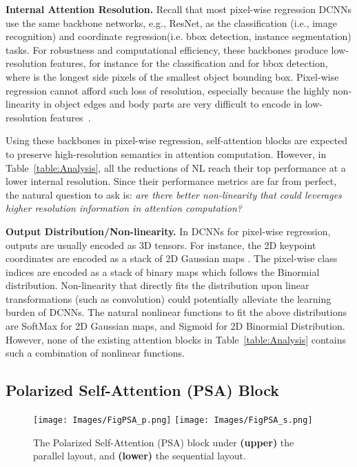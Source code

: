 \documentclass[10pt,twocolumn,letterpaper]{article}
\begin{document}
\textbf{Internal Attention Resolution.} Recall that most pixel-wise regression DCNNs use the same backbone networks, e.g., ResNet, as the classification (i.e., image recognition) and coordinate regression(i.e. bbox detection, instance segmentation) tasks. For robustness and computational efficiency, these backbones produce low-resolution features, for instance  for the classification and  for bbox detection, where  is the longest side pixels of the smallest object bounding box. Pixel-wise regression cannot afford such loss of resolution, especially because the highly non-linearity in object edges and body parts are very difficult to encode in low-resolution features~\cite{Chen17,Wang2020,Sun2019}.

Using these backbones in pixel-wise regression, self-attention blocks are expected to preserve high-resolution semantics in attention computation. However, in Table~\ref{table:Analysis}, all the reductions of NL reach their top performance at a lower internal resolution. Since their performance metrics are far from perfect, the natural question to ask is: \textit{are there better non-linearity that could leverages higher resolution information in attention computation?}

\textbf{Output Distribution/Non-linearity.} In DCNNs for pixel-wise regression, outputs are usually encoded as 3D tensors. For instance, the 2D keypoint coordinates are encoded as a stack of 2D Gaussian maps . The pixel-wise class indices are encoded as a stack of binary maps  which follows the Binormial distribution. Non-linearity that directly fits the distribution upon linear transformations (such as convolution) could potentially alleviate the learning burden of DCNNs. The natural nonlinear functions to fit the above distributions are SoftMax for 2D Gaussian maps, and Sigmoid for 2D Binormial Distribution. However, none of the existing attention blocks in Table~\ref{table:Analysis} contains such a combination of nonlinear functions. 

\subsection{Polarized Self-Attention (PSA) Block}
 
\begin{figure}[!htb]
\centering
\texttt{[image: Images/FigPSA\_p.png]}
\texttt{[image: Images/FigPSA\_s.png]}
\caption{The Polarized Self-Attention (PSA) block under \textbf{(upper)} the parallel layout,  and \textbf{(lower)} the sequential layout. }
  \label{fig:PSAlayer}
\end{figure}
\end{document}
